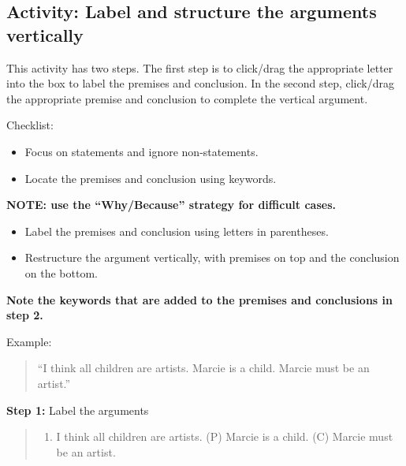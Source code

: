 \documentclass[
]{book}
\providecommand{\tightlist}{%
  \setlength{\itemsep}{0pt}\setlength{\parskip}{0pt}}
\begin{document}
\hypertarget{activity-label-and-structure-the-arguments-vertically}{%
\subsection*{Activity: Label and structure the arguments vertically}\label{activity-label-and-structure-the-arguments-vertically}}

\begin{reflect}
This activity has two steps. The first step is to click/drag the appropriate letter into the box to label the premises and conclusion. In the second step, click/drag the appropriate premise and conclusion to complete the vertical argument.

{Checklist:}

\begin{itemize}
\tightlist
\item
  Focus on statements and ignore non-statements.\\
\item
  Locate the premises and conclusion using keywords.
\end{itemize}

\textbf{NOTE: use the ``Why/Because'' strategy for difficult cases.}

\begin{itemize}
\tightlist
\item
  Label the premises and conclusion using letters in parentheses.\\
\item
  Restructure the argument vertically, with premises on top and the conclusion on the bottom.
\end{itemize}

\textbf{Note the keywords that are added to the premises and conclusions in step 2.}

{Example:}

\begin{quote}
``I think all children are artists. Marcie is a child. Marcie must be an artist.''
\end{quote}

\textbf{Step 1:} Label the arguments

\begin{quote}
\begin{enumerate}
\def\labelenumi{(\Alph{enumi})}
\setcounter{enumi}{15}
\tightlist
\item
  I think all children are artists. (P) Marcie is a child. (C) Marcie must be an artist.
\end{enumerate}
\end{quote}


\end{reflect}
\end{document}
